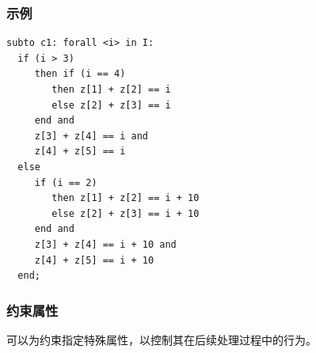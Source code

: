 \subsubsection{示例}
{\small
\begin{verbatim}
subto c1: forall <i> in I:
  if (i > 3)
     then if (i == 4)
        then z[1] + z[2] == i
        else z[2] + z[3] == i
     end and
     z[3] + z[4] == i and
     z[4] + z[5] == i
  else
     if (i == 2)
        then z[1] + z[2] == i + 10
        else z[2] + z[3] == i + 10
     end and
     z[3] + z[4] == i + 10 and
     z[4] + z[5] == i + 10
  end;
\end{verbatim}
}


\subsubsection{约束属性}
可以为约束指定特殊属性，以控制其在后续处理过程中的行为。

